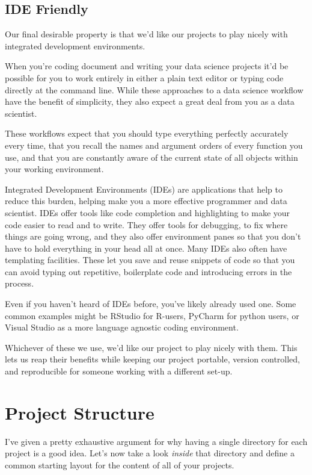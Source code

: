 \documentclass[
  12pt,
]{book}
\begin{document}
\hypertarget{ide-friendly}{%
\subsection{IDE Friendly}\label{ide-friendly}}

Our final desirable property is that we'd like our projects to play nicely
with integrated development environments.

When you're coding document and writing your data science projects it'd be possible for you to work entirely in either a plain text editor or typing code directly at the command line. While these approaches to a data science workflow have the benefit of simplicity, they also expect a great deal from you as a data scientist.

These workflows expect that you should type everything perfectly accurately every time, that you recall the names and argument orders of every function you use, and that you are constantly aware of the current state of all objects within your working environment.

Integrated Development Environments (IDEs) are applications that help to reduce this burden, helping make you a more effective programmer and data scientist. IDEs offer tools like code completion and highlighting to make your code easier to read and to write. They offer tools for debugging, to fix where things are going wrong, and they also offer environment panes so that you don't have to hold everything in your head all at once. Many IDEs also often have templating facilities. These let you save and reuse snippets of code so that you can avoid typing out repetitive, boilerplate code and introducing errors in the process.

Even if you haven't heard of IDEs before, you've likely already used one. Some common examples might be RStudio for R-users, PyCharm for python users, or Visual Studio as a more language agnostic coding environment.

Whichever of these we use, we'd like our project to play nicely with them. This lets us reap their benefits while keeping our project portable, version controlled, and reproducible for someone working with a different set-up.

\hypertarget{project-structure}{%
\section{Project Structure}\label{project-structure}}

I've given a pretty exhaustive argument for why having a single directory for each project is a good idea. Let's now take a look \emph{inside} that directory and define a common starting layout for the content of all of your projects.
\end{document}
